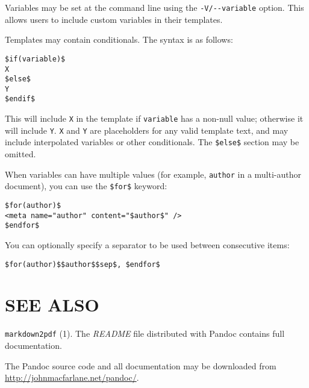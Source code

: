 \documentclass[
  12pt,
  a4paper,
]{article}
\begin{document}
Variables may be set at the command line using the \texttt{-V/-\/-variable}
option. This allows users to include custom variables in their templates.

Templates may contain conditionals. The syntax is as follows:

\begin{verbatim}
$if(variable)$
X 
$else$
Y
$endif$
\end{verbatim}

This will include \texttt{X} in the template if \texttt{variable} has a
non-null value; otherwise it will include \texttt{Y}. \texttt{X} and
\texttt{Y} are placeholders for any valid template text, and may include
interpolated variables or other conditionals. The \texttt{\$else\$} section
may be omitted.

When variables can have multiple values (for example, \texttt{author} in a
multi-author document), you can use the \texttt{\$for\$} keyword:

\begin{verbatim}
$for(author)$
<meta name="author" content="$author$" />
$endfor$
\end{verbatim}

You can optionally specify a separator to be used between consecutive items:

\begin{verbatim}
$for(author)$$author$$sep$, $endfor$
\end{verbatim}

\hypertarget{see-also}{%
\section{SEE ALSO}\label{see-also}}

\texttt{markdown2pdf} (1). The \emph{README} file distributed with Pandoc
contains full documentation.

The Pandoc source code and all documentation may be downloaded from
\url{http://johnmacfarlane.net/pandoc/}.
\end{document}
